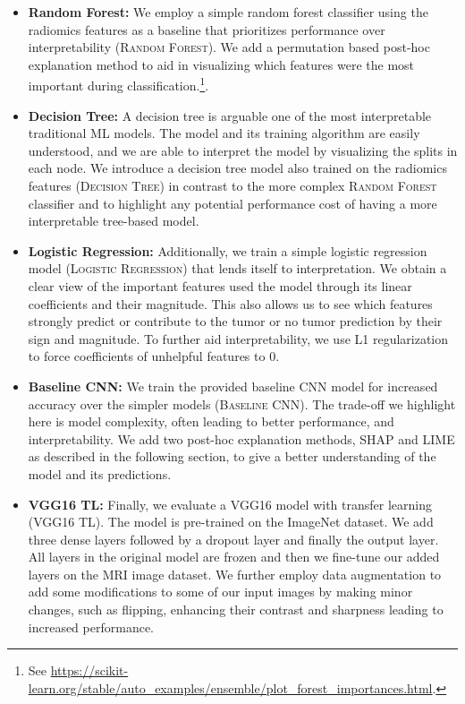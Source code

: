 \begin{itemize}[leftmargin=0cm]
    \setlength\itemsep{0.6em}
    \item[]
    \textbf{Random Forest:}
    We employ a simple random forest classifier \citep{breiman2001random} using the radiomics features as a baseline that prioritizes performance over interpretability (\textsc{Random Forest}). We add a permutation based post-hoc explanation method \citep{breiman2001random} to aid in visualizing which features were the most important during classification.\footnote{See \url{https://scikit-learn.org/stable/auto_examples/ensemble/plot_forest_importances.html}.}.\
    

    \item[]
    \textbf{Decision Tree:}
    A decision tree is arguable one of the most interpretable traditional ML models. The model and its training algorithm are easily understood, and we are able to interpret the model by visualizing the splits in each node. We introduce a decision tree model also trained on the radiomics features (\textsc{Decision Tree}) in contrast to the more complex \textsc{Random Forest} classifier and to highlight any potential performance cost of having a more interpretable tree-based model.
    
    \item[]
    \textbf{Logistic Regression:}
    Additionally, we train a simple logistic regression model (\textsc{Logistic Regression}) that lends itself to interpretation. We obtain a clear view of the important features used the model through its linear coefficients and their magnitude. This also allows us to see which features strongly predict or contribute to the tumor or no tumor prediction by their sign and magnitude. To further aid interpretability, we use L1 regularization to force coefficients of unhelpful features to 0.
    
    \item[]
    \textbf{Baseline CNN:}
    We train the provided baseline CNN model for increased accuracy over the simpler models (\textsc{Baseline CNN}). The trade-off we highlight here is model complexity, often leading to better performance, and interpretability. We add two post-hoc explanation methods, SHAP and LIME as described in the following section, to give a better understanding of the model and its predictions.
    
    
    \item[]
    \textbf{VGG16 TL:}
    Finally, we evaluate a VGG16 model with transfer learning (\textsc{VGG16 TL}). The model is pre-trained on the ImageNet dataset. We add three dense layers followed by a dropout layer and finally the output layer. All layers in the original model are frozen and then we fine-tune our added layers on the MRI image dataset. We further employ data augmentation to add some modifications to some of our input images by making minor changes, such as flipping, enhancing their contrast and sharpness leading to increased performance.
\end{itemize}
    
